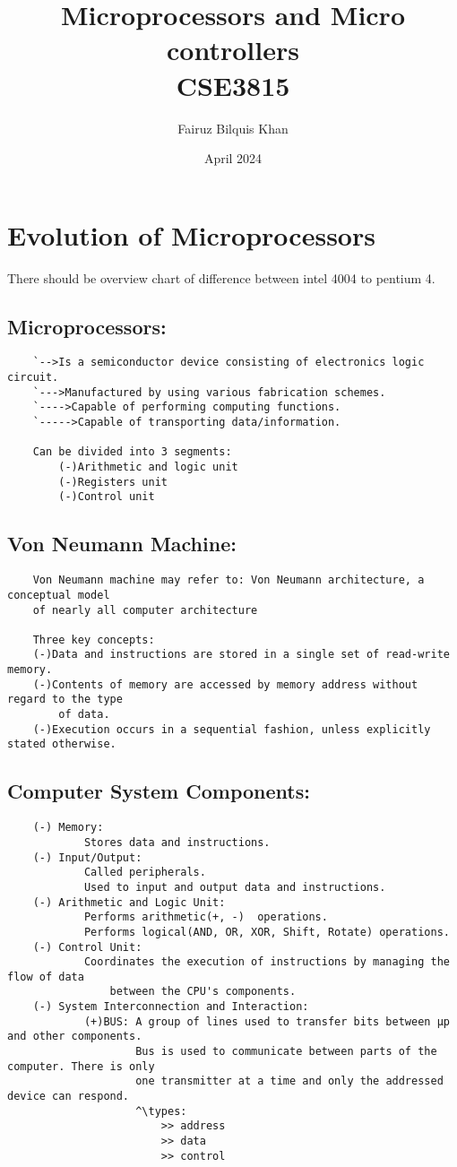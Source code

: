 \documentclass{article}
\title{Microprocessors and Micro controllers \\ CSE3815}
\author{Fairuz Bilquis Khan}
\date{April 2024}
\begin{document}
\maketitle
\newpage
\section*{Evolution of Microprocessors}
There should be overview chart of difference between intel 4004 to pentium 4.
\newpage
\subsection*{Microprocessors:}
\begin{verbatim}
    `-->Is a semiconductor device consisting of electronics logic circuit.
    `--->Manufactured by using various fabrication schemes.
    `---->Capable of performing computing functions.
    `----->Capable of transporting data/information.

    Can be divided into 3 segments:
        (-)Arithmetic and logic unit
        (-)Registers unit
        (-)Control unit
\end{verbatim}

\subsection*{Von Neumann Machine:}
\begin{verbatim}
    Von Neumann machine may refer to: Von Neumann architecture, a conceptual model
    of nearly all computer architecture

    Three key concepts:
    (-)Data and instructions are stored in a single set of read-write memory.
    (-)Contents of memory are accessed by memory address without regard to the type
        of data.
    (-)Execution occurs in a sequential fashion, unless explicitly stated otherwise.
\end{verbatim}

\subsection*{Computer System Components:}
\begin{verbatim}
    (-) Memory:
            Stores data and instructions.
    (-) Input/Output:
            Called peripherals.
            Used to input and output data and instructions.
    (-) Arithmetic and Logic Unit:
            Performs arithmetic(+, -)  operations.
            Performs logical(AND, OR, XOR, Shift, Rotate) operations.
    (-) Control Unit:
            Coordinates the execution of instructions by managing the flow of data 
                between the CPU's components.
    (-) System Interconnection and Interaction:
            (+)BUS: A group of lines used to transfer bits between µp and other components.
                    Bus is used to communicate between parts of the computer. There is only
                    one transmitter at a time and only the addressed device can respond.
                    ^\types:
                        >> address
                        >> data
                        >> control
   
        \end{verbatim}
\newpage
\end{document}
